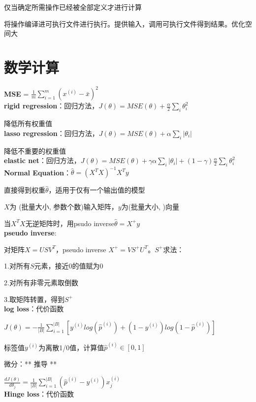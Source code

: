 \documentclass[UTF8]{ctexart}
\begin{document}
  仅当确定所需操作已经被全部定义才进行计算

  将操作编译进可执行文件进行执行。提供输入，调用可执行文件得到结果。优化空间大

\section{数学计算}
\noindent \textbf{MSE} = $\frac{1}{m}\sum_{i=1}^{m}(x^{(i)} - \bar{x} )^2$\\
\textbf{rigid regression}：回归方法，$J(\theta) = MSE(\theta) + \frac{\alpha}{2}\sum_{i}\theta_i^2$

  降低所有权重值\\
\textbf{lasso regression}：回归方法，$J(\theta) = MSE(\theta) + \alpha \sum_i |\theta_i|$

  降低不重要的权重值\\
\textbf{elastic net}：回归方法，$J(\theta) = MSE(\theta) + \gamma\alpha \sum_i |\theta_i| + (1-\gamma)\frac{\alpha}{2}\sum_{i}\theta_i^2$\\
\textbf{Normal Equation}：$\hat{\theta} = (X^TX)^{-1}X^Ty$

  直接得到权重$\hat{\theta}$，适用于仅有一个输出值的模型

  $X$为 (批量大小, 参数个数)输入矩阵，$y$为(批量大小, )向量
  
  当$X^TX$无逆矩阵时，用psudo inverse$\hat{\theta} = X^+y$\\
\textbf{pseudo inverse}:

  对矩阵$X=USV^T$，pseudo inverse $X^+=VS^+U^T$。$S^+$求法：

  \quad 1.对所有$S$元素，接近0的值赋为0

  \quad 2.对所有非零元素取倒数

  \quad 3.取矩阵转置，得到$S^+$\\
\textbf{log loss}：代价函数

  $J(\theta) = -\frac{1}{|B|}\sum_{i=1}^{|B|}[y^{(i)}log(\hat{p}^{(i)}) + (1-y^{(i)})log(1-\hat{p}^{(i)})]$

  标签值$y^{(i)}$为离散1/0值，计算值$\hat{p}^{(i)} \in [0,1]$

  微分：** 推导 **
  
  \quad $\frac{d J(\theta)}{d \theta_j} = \frac{1}{|B|}\sum_{i=1}^{|B|}(\hat{p}^{(i)} - y^{(i)}) x_j^{(i)}$\\
\textbf{Hinge loss}：代价函数
\end{document}
